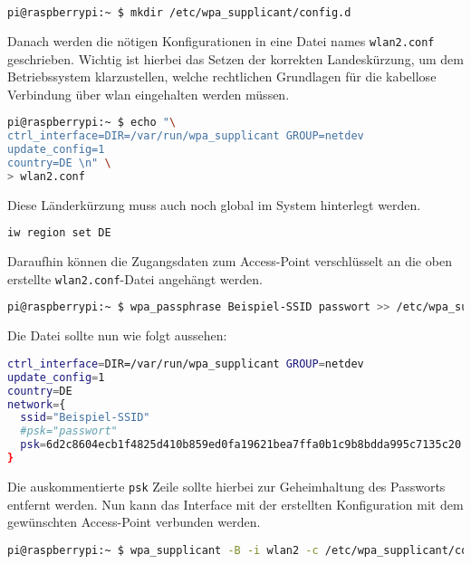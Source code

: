 \begin{lstlisting}[language=Bash]
pi@raspberrypi:~ $ mkdir /etc/wpa_supplicant/config.d
\end{lstlisting}

\noindent Danach werden die nötigen Konfigurationen in eine Datei names \texttt{wlan2.conf} geschrieben.
Wichtig ist hierbei das Setzen der korrekten Landeskürzung, um dem Betriebssystem klarzustellen, welche rechtlichen Grundlagen
für die kabellose Verbindung über \gls{wlan} eingehalten werden müssen.

\begin{lstlisting}[language=Bash]
pi@raspberrypi:~ $ echo "\
ctrl_interface=DIR=/var/run/wpa_supplicant GROUP=netdev
update_config=1
country=DE \n" \
> wlan2.conf
\end{lstlisting}

\noindent Diese Länderkürzung muss auch noch global im System hinterlegt werden.

\begin{lstlisting}[language=Bash]
iw region set DE
\end{lstlisting}

\noindent Daraufhin können die Zugangsdaten zum Access-Point verschlüsselt an die oben erstellte \texttt{wlan2.conf}-Datei angehängt werden.

\begin{lstlisting}[language=Bash]
pi@raspberrypi:~ $ wpa_passphrase Beispiel-SSID passwort >> /etc/wpa_supplicant/conf.d/wlan2.conf
\end{lstlisting}

\noindent Die Datei sollte nun wie folgt aussehen:

\begin{lstlisting}[language=Bash]
ctrl_interface=DIR=/var/run/wpa_supplicant GROUP=netdev
update_config=1
country=DE
network={
  ssid="Beispiel-SSID"
  #psk="passwort"
  psk=6d2c8604ecb1f4825d410b859ed0fa19621bea7ffa0b1c9b8bdda995c7135c20
}
\end{lstlisting}

\noindent Die auskommentierte \texttt{psk} Zeile sollte hierbei zur Geheimhaltung des Passworts entfernt werden.
Nun kann das Interface mit der erstellten Konfiguration mit dem gewünschten Access-Point verbunden werden.

\begin{lstlisting}[language=Bash]
pi@raspberrypi:~ $ wpa_supplicant -B -i wlan2 -c /etc/wpa_supplicant/conf.d/wlan2.conf
\end{lstlisting}

